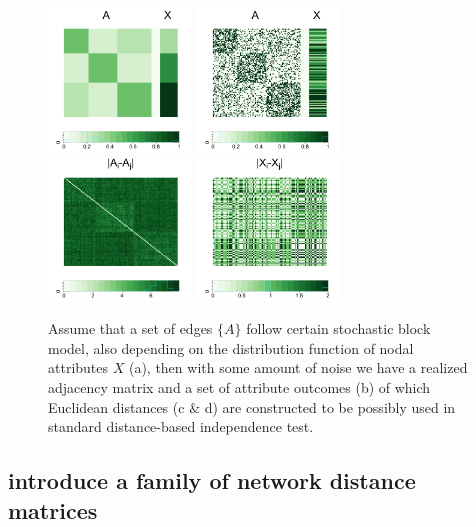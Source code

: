 \documentclass[12pt]{article}
\begin{document}
\begin{figure}[H]
	\centering
	\includegraphics[width=1.5in]{../Figure/pmat.png}
	\includegraphics[width=1.5in]{../Figure/Amat.png}
	\includegraphics[width=1.5in]{../Figure/distA.png}
	\includegraphics[width=1.5in]{../Figure/distX.png}
	\caption{Assume that a set of edges $\{ A \}$ follow certain stochastic block model, also depending on the distribution function of nodal attributes $X$ (a), then with some amount of noise we have a realized adjacency matrix and a set of attribute outcomes (b) of which Euclidean distances (c $\&$ d) are constructed to be possibly used in standard distance-based independence test.}
	\label{fig:matrics}
\end{figure}	

\subsection*{introduce a family of network distance matrices} 
\end{document}
